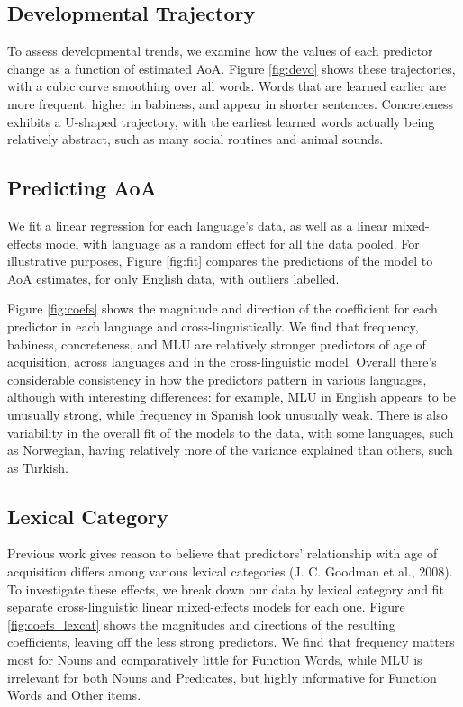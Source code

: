 \documentclass[10pt, letterpaper]{article}
\begin{document}
\subsection{Developmental Trajectory}\label{developmental-trajectory}

To assess developmental trends, we examine how the values of each
predictor change as a function of estimated AoA. Figure \ref{fig:devo}
shows these trajectories, with a cubic curve smoothing over all words.
Words that are learned earlier are more frequent, higher in babiness,
and appear in shorter sentences. Concreteness exhibits a U-shaped
trajectory, with the earliest learned words actually being relatively
abstract, such as many social routines and animal sounds.

\subsection{Predicting AoA}\label{predicting-aoa}

We fit a linear regression for each language's data, as well as a linear
mixed-effects model with language as a random effect for all the data
pooled. For illustrative purposes, Figure \ref{fig:fit} compares the
predictions of the model to AoA estimates, for only English data, with
outliers labelled.

Figure \ref{fig:coefs} shows the magnitude and direction of the
coefficient for each predictor in each language and
cross-linguistically. We find that frequency, babiness, concreteness,
and MLU are relatively stronger predictors of age of acquisition, across
languages and in the cross-linguistic model. Overall there's
considerable consistency in how the predictors pattern in various
languages, although with interesting differences: for example, MLU in
English appears to be unusually strong, while frequency in Spanish look
unusually weak. There is also variability in the overall fit of the
models to the data, with some languages, such as Norwegian, having
relatively more of the variance explained than others, such as Turkish.

\subsection{Lexical Category}\label{lexical-category}

Previous work gives reason to believe that predictors' relationship with
age of acquisition differs among various lexical categories (J. C.
Goodman et al., 2008). To investigate these effects, we break down our
data by lexical category and fit separate cross-linguistic linear
mixed-effects models for each one. Figure \ref{fig:coefs_lexcat} shows
the magnitudes and directions of the resulting coefficients, leaving off
the less strong predictors. We find that frequency matters most for
Nouns and comparatively little for Function Words, while MLU is
irrelevant for both Nouns and Predicates, but highly informative for
Function Words and Other items.
\end{document}
